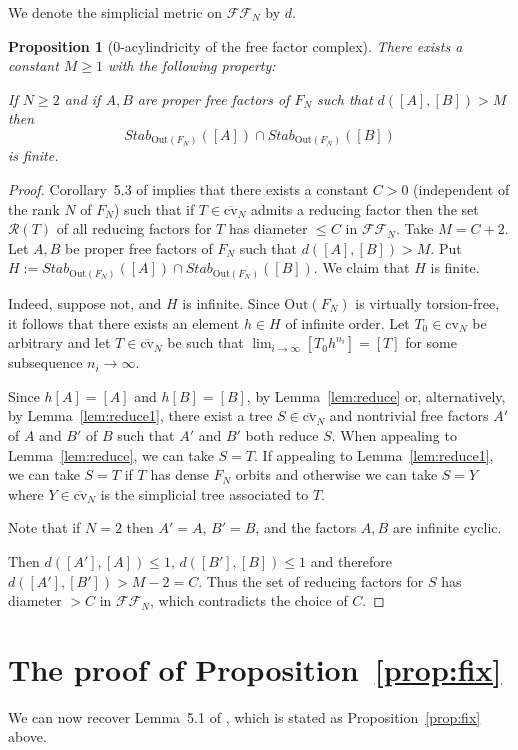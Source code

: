 \documentclass[10pt]{amsart}
\newcommand\<{\langle}
\renewcommand\>{\rangle}
\newcommand{\Out}{\mbox{Out}}
\newcommand{\cvn}{\mbox{cv}_N}
\newcommand{\cvnbar}{\overline{\mbox{cv}}_N}
\newtheorem{prop}[thm]{Proposition}
\theoremstyle{definition}
\begin{document}
We denote the simplicial metric on $\mathcal{FF}_N$ by $d$.

\begin{prop}[0-acylindricity of the free factor complex]\label{prop:acyl}
There exists a constant $M\ge 1$ with the following property:


If $N\ge 2$ and if $A,B$ are proper free factors of $F_N$ such that $d([A],[B])>M$ then
\[
Stab_{\Out(F_N)}([A]) \cap Stab_{\Out(F_N)}([B]) 
\]
is finite.
\end{prop}

\begin{proof}
Corollary~5.3 of \cite{BR} implies that there exists a constant $C>0$ (independent of the rank $N$ of $F_N$)  such that if $T\in\cvnbar$ admits a reducing factor then the set $\mathcal R(T)$ of all reducing factors for $T$ has diameter $\le C$ in $\mathcal{FF}_N$.  Take $M=C+2$. Let $A,B$ be proper free factors of $F_N$ such that $d([A],[B])>M$.
Put $H:=Stab_{\Out(F_N)}([A]) \cap Stab_{\Out(F_N)}([B])$. We claim that $H$ is finite.

Indeed, suppose not, and $H$ is infinite. Since $\Out(F_N)$ is virtually torsion-free, it follows that there exists an element $h\in H$ of infinite order.
Let $T_0\in \cvn$ be arbitrary and let $T\in\cvnbar$ be such that
$\lim_{i\to\infty} [T_0h^{n_i}]=[T]$ for some subsequence $n_i\to\infty$.


Since $h[A]=[A]$ and $h[B]=[B]$, by Lemma~\ref{lem:reduce} or,
alternatively, by Lemma~\ref{lem:reduce1}, there exist a tree
$S\in\cvnbar$ and
nontrivial free factors $A'$ of $A$ and $B'$ of $B$ such that $A'$ and
$B'$ both reduce $S$. When appealing to Lemma~\ref{lem:reduce}, we can
take $S=T$. If appealing to Lemma~\ref{lem:reduce1}, we can take $S=T$
if $T$ has dense $F_N$ orbits and otherwise we can take $S=Y$ where
$Y\in\cvnbar$ is the simplicial tree associated to $T$.

Note that if $N=2$ then $A'=A$, $B'=B$, and the
factors $A,B$ are infinite cyclic.

Then $d([A'],[A])\le 1$, $d([B'],[B])\le 1$ and therefore $d([A'],[B'])> M-2=C$.
Thus the set of reducing factors for $S$ has diameter $>C$ in $\mathcal{FF}_N$, which contradicts the choice of $C$.
\end{proof}


\section{The proof of Proposition~\ref{prop:fix}}
We can now recover Lemma~5.1 of \cite{CFKM}, which is stated as
Proposition~\ref{prop:fix} above.
\end{document}
